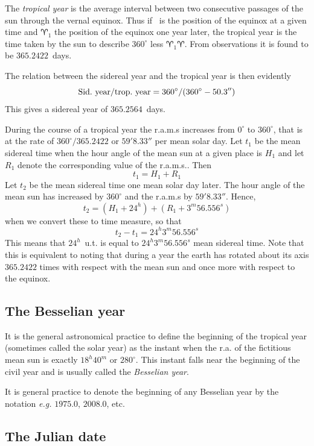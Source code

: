 The {\it tropical year} is the average interval between two consecutive 
passages of the sun through the vernal equinox. Thus if \aries\ is the 
position of the equinox
at a given time and $\aries_1$ the position of the equinox one year later, the 
tropical year is the time taken by the sun to describe $360^\circ$ less 
$\aries_1\aries$. From observations it is found to be $365.2422$~days. 

The relation between the sidereal year and the tropical year is then evidently
\[ 
{{\rm Sid.~year}/{\rm trop.~year}}={360^\circ/{(360^\circ-50.3'')}}
\]
This gives a sidereal year of $365.2564$~days.

During the course of a tropical year the {\sc r.a.m.s} increases from $0^\circ$ to
$360^\circ$, that is at the rate of $360^\circ/365.2422$ or $59'8.33''$ per mean 
solar day. Let $t_1$ be the mean sidereal time when the hour angle of the mean sun
at a given place is $H_1$ and let $R_1$ denote the corresponding value of 
the {\sc r.a.m.s.}. Then
\[
t_1=H_1+R_1
\]
Let $t_2$ be the mean sidereal time one mean solar day later. The hour angle of 
the mean sun has increased by $360^\circ$ and the {\sc r.a.m.s} by $59'8.33''$.
Hence,
\[
t_2=(H_1+24^h)+(R_1+3^m56.556^s)
\]
when we convert these to time measure, so that 
\[
t_2-t_1=24^h3^m56.556^s
\]
This means that $24^h$~{\sc u.t.} is equal to $24^h3^m56.556^s$ mean sidereal time.
Note that this is equivalent to noting that during a year the earth has rotated about
its axis $365.2422$ times with respect with the mean sun and once more with respect
to the equinox.

\subsection{The Besselian year}

It is the general astronomical practice to define the beginning of the tropical year
(sometimes called the solar year) as the instant when the {\sc r.a.} of the fictitious
mean sun is exactly $18^h40^m$ or $280^\circ$. This instant falls near the beginning of
the civil year and is usually called the {\it Besselian year}. 

It is general practice to denote the beginning of any Besselian year by the notation
{\it e.g.} $1975.0$, $2008.0$, etc.

\subsection{The Julian date}

